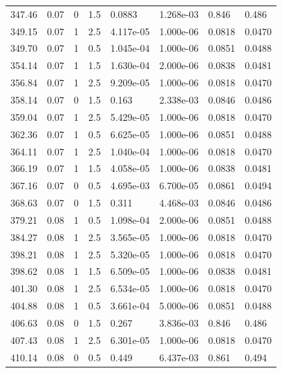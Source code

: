\documentclass[preview]{standalone}
\begin{document}
{{{\begin{tabular}{L{1.2cm}C{1.2cm} C{0.3cm}C{0.5cm} C{1.4cm}C{1.4cm} C{1.4cm}C{1.4cm}}
  347.46  &  0.07  & 0     & 1.5 &  0.0883  & 1.268e-03  & 0.846 &  0.486   \\ 
  349.15  &  0.07  & 1     & 2.5 &  4.117e-05  & 1.000e-06  & 0.0818 &  0.0470   \\ 
  349.70  &  0.07  & 1     & 0.5 &  1.045e-04  & 1.000e-06  & 0.0851 &  0.0488   \\ 
  354.14  &  0.07  & 1     & 1.5 &  1.630e-04  & 2.000e-06  & 0.0838 &  0.0481   \\ 
  356.84  &  0.07  & 1     & 2.5 &  9.209e-05  & 1.000e-06  & 0.0818 &  0.0470   \\ 
  358.14  &  0.07  & 0     & 1.5 &  0.163  & 2.338e-03  & 0.0846 &  0.0486   \\ 
  359.04  &  0.07  & 1     & 2.5 &  5.429e-05  & 1.000e-06  & 0.0818 &  0.0470   \\ 
  362.36  &  0.07  & 1     & 0.5 &  6.625e-05  & 1.000e-06  & 0.0851 &  0.0488   \\ 
  364.11  &  0.07  & 1     & 2.5 &  1.040e-04  & 1.000e-06  & 0.0818 &  0.0470   \\ 
  366.19  &  0.07  & 1     & 1.5 &  4.058e-05  & 1.000e-06  & 0.0838 &  0.0481   \\ 
  367.16  &  0.07  & 0     & 0.5 &  4.695e-03  & 6.700e-05  & 0.0861 &  0.0494   \\ 
  368.63  &  0.07  & 0     & 1.5 &  0.311  & 4.468e-03  & 0.0846 &  0.0486   \\ 
  379.21  &  0.08  & 1     & 0.5 &  1.098e-04  & 2.000e-06  & 0.0851 &  0.0488   \\ 
  384.27  &  0.08  & 1     & 2.5 &  3.565e-05  & 1.000e-06  & 0.0818 &  0.0470   \\ 
  398.21  &  0.08  & 1     & 2.5 &  5.320e-05  & 1.000e-06  & 0.0818 &  0.0470   \\ 
  398.62  &  0.08  & 1     & 1.5 &  6.509e-05  & 1.000e-06  & 0.0838 &  0.0481   \\ 
  401.30  &  0.08  & 1     & 2.5 &  6.534e-05  & 1.000e-06  & 0.0818 &  0.0470   \\ 
  404.88  &  0.08  & 1     & 0.5 &  3.661e-04  & 5.000e-06  & 0.0851 &  0.0488   \\ 
  406.63  &  0.08  & 0     & 1.5 &  0.267  & 3.836e-03  & 0.846 &  0.486   \\ 
  407.43  &  0.08  & 1     & 2.5 &  6.301e-05  & 1.000e-06  & 0.0818 &  0.0470   \\ 
  410.14  &  0.08  & 0     & 0.5 &  0.449  & 6.437e-03  & 0.861 &  0.494   \\ 

\end{tabular}}}}
\end{document}
